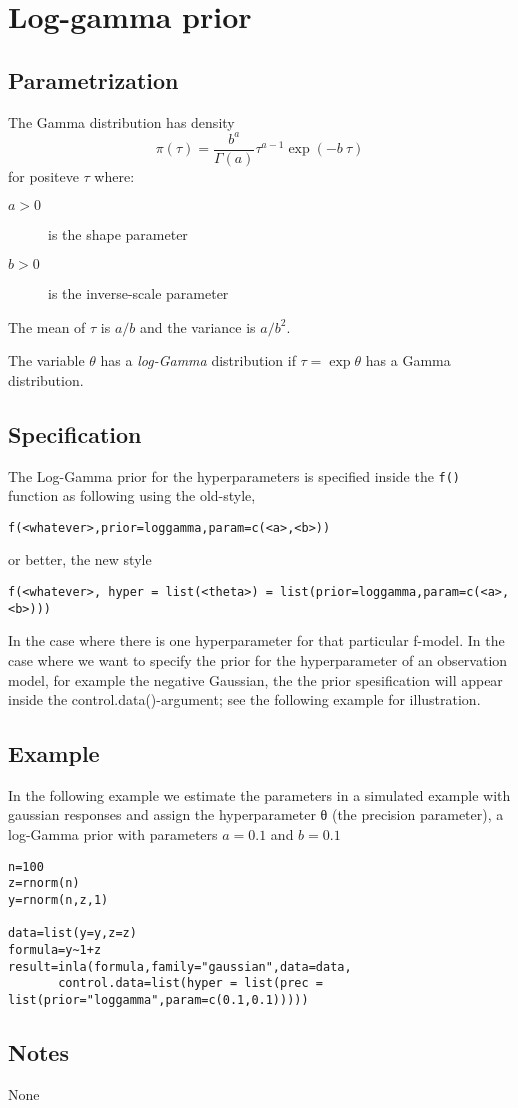 \documentclass[a4paper,11pt]{article}
\begin{document}
\section*{ Log-gamma prior}

\subsection*{Parametrization}
The Gamma distribution has density
\begin{equation}
\pi(\tau)=\frac{b^a}{\Gamma(a)}\tau^{a-1}\exp(-b\ \tau)
\end{equation}
for positeve $\tau$ where:
\begin{description}
\item[$a>0$] is the shape parameter
\item[$b>0$] is the inverse-scale parameter
\end{description}
The mean of $\tau$ is $a/b$ and the variance is $a/b^2$.

The variable $\theta$ has a {\it log-Gamma} distribution if $\tau=\exp\theta$ has a Gamma distribution.

\subsection*{Specification}
The Log-Gamma prior for the hyperparameters is specified inside the
{\tt f()} function as following using the old-style,
\begin{center}
    {\tt f(<whatever>,prior=loggamma,param=c(<a>,<b>))}
\end{center}
or better, the new style
\begin{center}
    {\tt f(<whatever>, hyper = list(<theta>) = list(prior=loggamma,param=c(<a>,<b>)))}
\end{center}
In the case where there is one hyperparameter for that particular
f-model. In the case where we want to specify the prior for the
hyperparameter of an observation model, for example the negative
Gaussian, the the prior spesification will appear inside the
control.data()-argument; see the following example for illustration.

\subsection*{Example}

In the following example we estimate the parameters in a simulated
example with gaussian responses and assign the hyperparameter θ (the
precision parameter), a log-Gamma prior with parameters $a=0.1$ and
$b=0.1$


\begin{verbatim}
n=100
z=rnorm(n)
y=rnorm(n,z,1)

data=list(y=y,z=z)
formula=y~1+z
result=inla(formula,family="gaussian",data=data,
       control.data=list(hyper = list(prec = list(prior="loggamma",param=c(0.1,0.1)))))
\end{verbatim}

\subsection*{Notes}
None
\end{document}
